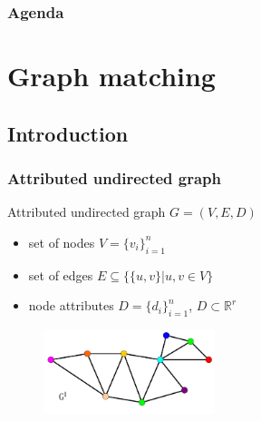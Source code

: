 \documentclass[handout]{beamer}
\begin{document}
\begin{frame}
\frametitle{Agenda}
\tableofcontents
\end{frame} 
\section{Graph matching} 
\subsection{Introduction}

\begin{frame}
\frametitle{Attributed undirected graph}
Attributed undirected graph $G=(V,E,D)$
\begin{itemize}
\item set of nodes $V=\{v_i\}_{i=1}^{n}$
\item set of edges $E\subseteq\{\{u,v\}| u, v\in V\}$
\item node attributes $D=\{d_i\}_{i=1}^{n}$, $D\subset\mathbb{R}^r$
\end{itemize}
\vspace{1cm}
\begin{figure}[b]
    \centering
    \includegraphics[width=5cm]{fig/at_graph_1.pdf}
\end{figure}%
\end{frame}
\end{document}
